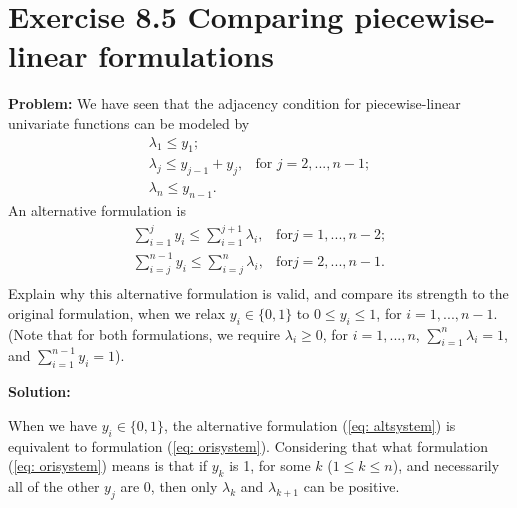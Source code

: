 \section{Exercise 8.5 Comparing piecewise-linear formulations}
\textbf{Problem:} We have seen that the adjacency condition for piecewise-linear univariate functions can be modeled by
\begin{equation}
\label{eq: orisystem}
  \begin{array}{lrcll}
    \lambda_1\leq{}y_1; &\\
    \lambda_j\leq{}y_{j-1}+y_j, & \text{for } j=2,...,n-1;\\
    \lambda_n\leq{}y_{n-1}. &
  \end{array}
\end{equation}
An alternative formulation is
\begin{equation}
\label{eq: altsystem}
  \begin{array}{lrcll}
   \sum_{i=1}^{j} y_i\leq{}\sum_{i=1}^{j+1} \lambda_i, & \text{for} j=1,...,n-2;\\
   \sum_{i=j}^{n-1} y_i\leq{}\sum_{i=j}^{n} \lambda_i, & \text{for} j=2,...,n-1.\\
  \end{array}
\end{equation}
Explain why this alternative formulation is valid, and compare its strength to the original formulation, when we relax $y_i\in\lbrace0,1\rbrace$ to $0\leq{}y_i\leq1$, for $i=1,...,n−1$. (Note that for both formulations, we require $\lambda_i\geq0$, for $i=1,...,n$, $\sum_{i=1}^{n} \lambda_i=1$, and
$\sum_{i=1}^{n-1} y_i=1$).

\textbf{Solution:} 

When we have $y_i\in\lbrace0,1\rbrace$, the alternative formulation (\ref{eq: altsystem}) is equivalent to formulation (\ref{eq: orisystem}). Considering that what formulation (\ref{eq: orisystem}) means is that if $y_k$ is 1, for some $k$ ($1\leq{}k\leq{}n$), and necessarily all of the other $y_j$ are 0, then only $\lambda_k$ and $\lambda_{k+1}$ can be positive.
